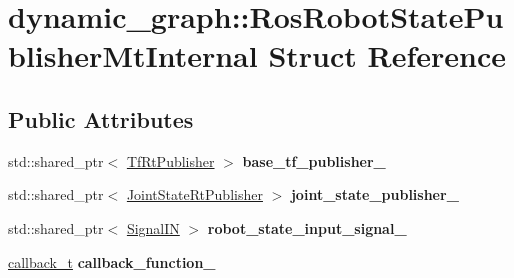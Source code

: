 \hypertarget{structdynamic__graph_1_1RosRobotStatePublisherMtInternal}{}\section{dynamic\+\_\+graph\+:\+:Ros\+Robot\+State\+Publisher\+Mt\+Internal Struct Reference}
\label{structdynamic__graph_1_1RosRobotStatePublisherMtInternal}
\subsection*{Public Attributes}
\begin{DoxyCompactItemize}
\item 
std\+::shared\+\_\+ptr$<$ \hyperlink{namespacedynamic__graph_ac8d567b9a3d1ab846ba2efdc1ff1e120}{Tf\+Rt\+Publisher} $>$ {\bfseries base\+\_\+tf\+\_\+publisher\+\_\+}\hypertarget{structdynamic__graph_1_1RosRobotStatePublisherMtInternal_aab90866aadd382e54d32f7fef36a2104}{}\label{structdynamic__graph_1_1RosRobotStatePublisherMtInternal_aab90866aadd382e54d32f7fef36a2104}

\item 
std\+::shared\+\_\+ptr$<$ \hyperlink{namespacedynamic__graph_ae9ad83c8174a9aa5bc1688df02b4ee95}{Joint\+State\+Rt\+Publisher} $>$ {\bfseries joint\+\_\+state\+\_\+publisher\+\_\+}\hypertarget{structdynamic__graph_1_1RosRobotStatePublisherMtInternal_a3d4474426dd6e6b7be683e0f3e9bbe93}{}\label{structdynamic__graph_1_1RosRobotStatePublisherMtInternal_a3d4474426dd6e6b7be683e0f3e9bbe93}

\item 
std\+::shared\+\_\+ptr$<$ \hyperlink{namespacedynamic__graph_ae1463c695a6915ea3f9ab4311beb527a}{Signal\+IN} $>$ {\bfseries robot\+\_\+state\+\_\+input\+\_\+signal\+\_\+}\hypertarget{structdynamic__graph_1_1RosRobotStatePublisherMtInternal_a3ac5d56e51dc8a49b75e73e5d4eddad0}{}\label{structdynamic__graph_1_1RosRobotStatePublisherMtInternal_a3ac5d56e51dc8a49b75e73e5d4eddad0}

\item 
\hyperlink{namespacedynamic__graph_adf7d40f2a8d1425af80c14f90e58e961}{callback\+\_\+t} {\bfseries callback\+\_\+function\+\_\+}\hypertarget{structdynamic__graph_1_1RosRobotStatePublisherMtInternal_adc98e11fb54943fc891977203d0c68fd}{}\label{structdynamic__graph_1_1RosRobotStatePublisherMtInternal_adc98e11fb54943fc891977203d0c68fd}


\end{DoxyCompactItemize}
